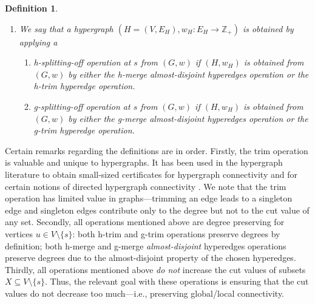 \documentclass{article}
\newtheorem{definition}{Definition}[section]
\providecommand{\Z}{\mathbb{Z}}
\begin{document}
\begin{definition}
\begin{enumerate}
\item We say that a hypergraph $(H=(V, E_H), w_H: E_H\rightarrow \Z_+)$ is obtained by applying a 
        \begin{enumerate}
            \item \emph{h-splitting-off operation at $s$ from $(G, w)$} if $(H, w_H)$ is obtained from $(G, w)$ by either the h-merge almost-disjoint hyperedges operation or the h-trim hyperedge operation. 
            \item \emph{g-splitting-off operation at $s$ from $(G, w)$} if $(H, w_H)$ is obtained from $(G, w)$ by either the g-merge almost-disjoint hyperedges operation or the g-trim hyperedge operation. 
        \end{enumerate}

\end{enumerate}
\end{definition}
Certain remarks regarding the definitions are in order. 
Firstly, the trim operation is valuable and unique to hypergraphs. It has been used in the hypergraph literature to obtain small-sized certificates for hypergraph connectivity \cite{CX18} and for certain notions of directed hypergraph connectivity \cite{Frank-book}. 
We note that the trim operation has limited value in graphs---trimming an edge leads to a singleton edge and singleton edges contribute only to the degree but not to the cut value of any set. 
Secondly, all operations mentioned above are degree preserving for vertices $u\in V\setminus \{s\}$: both h-trim and g-trim operations preserve degrees by definition; both h-merge and g-merge \emph{almost-disjoint} hyperedges operations preserve degrees due to the almost-disjoint property of the chosen hyperedges. 
Thirdly, all operations mentioned above 
\emph{do not} increase the %
cut values of subsets $X\subseteq V\setminus\{s\}$. Thus, the relevant goal with these operations is ensuring that the cut values do not decrease too much---i.e., preserving global/local connectivity. 
\end{document}
